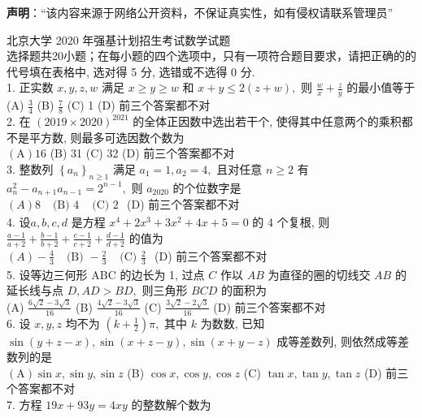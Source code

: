 

\textbf{声明}：“该内容来源于网络公开资料，不保证真实性，如有侵权请联系管理员”


北京大学 2020 年强基计划招生考试数学试题\\
选择题共20小题；在每小题的四个选项中，只有一项符合题目要求，请把正确的的代号填在表格中, 选对得 5 分, 选错或不选得 0 分.\\
1. 正实数 $x, y, z, w$ 满足 $x \geq y \geq w$ 和 $x+y \leq 2(z+w),$ 则 $\frac{w}{x}+\frac{z}{y}$ 的最小值等于\\
(A) $\frac{3}{4}$
(B) $\frac{7}{8}$
(C) 1
(D) 前三个答案都不对\\
2. 在 $(2019 \times 2020)^{2021}$ 的全体正因数中选出若干个, 使得其中任意两个的乘积都不是平方数, 则最多可选因数个数为\\
$(\mathrm{A}) 16$
(B) 31
(C) 32
(D) 前三个答案都不对\\
3. 整数列 $\left\{a_{n}\right\}_{n \geq 1}$ 满足 $a_{1}=1, a_{2}=4,$ 且对任意 $n \geq 2$ 有 $a_{n}^{2}-a_{n+1} a_{n-1}=2^{n-1},$ 则 $a_{2020}$ 的个位数字是\\
$(A) 8$
$\begin{array}{ll}\text { (B) } 4 & \text { (C) } 2\end{array}$
(D) 前三个答案都不对\\
4. 设$a, b, c, d$ 是方程 $x^{4}+2 x^{3}+3 x^{2}+4 x+5=0$ 的 4 个复根, 则 $\frac{a-1}{a+2}+\frac{b-1}{b+2}+\frac{c-1}{c+2}+\frac{d-1}{d+2}$
的值为\\
$(A)-\frac{4}{3}$
$\begin{array}{ll}\text { (B) }-\frac{2}{3} & \text { (C) } \frac{2}{3}\end{array}$
(D) 前三个答案都不对\\
5. 设等边三何形 ABC 的边长为 1, 过点 $C$ 作以 $A B$ 为直径的圈的切线交 $A B$ 的延长线与点 $D, A D>B D,$ 则三角形 $B C D$ 的面积为\\
(A) $\frac{6 \sqrt{2}-3 \sqrt{3}}{16}$
(B) $\frac{4 \sqrt{2}-3 \sqrt{3}}{16}$
(C) $\frac{3 \sqrt{2}-2 \sqrt{3}}{16}$
(D) 前三个答案都不对\\
6. 设 $x, y, z$ 均不为 $\left(k+\frac{1}{2}\right) \pi,$ 其中 $k$ 为数数, 已知$\sin (y+z-x), \sin (x+z-y), \sin (x+
y-z )$ 成等差数列, 则依然成等差数列的是\\
$(\mathrm{A}) \sin x, \sin y, \sin z$
(B) $\cos x, \cos y, \cos z$
(C) $\tan x, \tan y, \tan z$
(D) 前三个答案都不对\\
7. 方程 $19 x+93 y=4 x y$ 的整数解个数为\\

